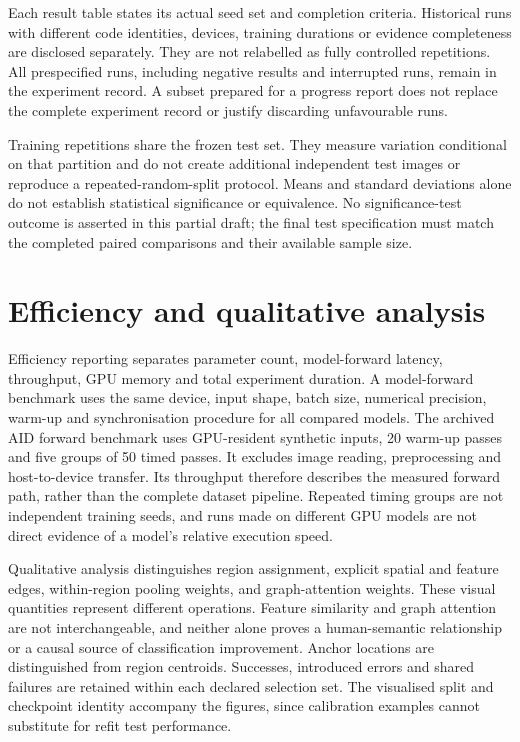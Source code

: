 Each result table states its actual seed set and completion criteria.
Historical runs with different code identities, devices, training durations
or evidence completeness are disclosed separately. They are not relabelled
as fully controlled repetitions. All prespecified runs, including negative
results and interrupted runs, remain in the experiment record. A subset
prepared for a progress report does not replace the complete experiment
record or justify discarding unfavourable runs.

Training repetitions share the frozen test set. They measure variation
conditional on that partition and do not create additional independent test
images or reproduce a repeated-random-split protocol. Means and standard
deviations alone do not establish statistical significance or equivalence.
No significance-test outcome is asserted in this partial draft; the final
test specification must match the completed paired comparisons and their
available sample size.

\section{Efficiency and qualitative analysis}

Efficiency reporting separates parameter count, model-forward latency,
throughput, GPU memory and total experiment duration. A model-forward
benchmark uses the same device, input shape, batch size, numerical precision,
warm-up and synchronisation procedure for all compared models. The archived
AID forward benchmark uses GPU-resident synthetic inputs, 20 warm-up passes
and five groups of 50 timed passes. It excludes image reading, preprocessing
and host-to-device transfer. Its throughput therefore describes the measured
forward path, rather than the complete dataset pipeline. Repeated timing
groups are not independent training seeds, and runs made on different GPU
models are not direct evidence of a model's relative execution speed.

Qualitative analysis distinguishes region assignment, explicit spatial and
feature edges, within-region pooling weights, and graph-attention weights.
These visual quantities represent different operations. Feature similarity
and graph attention are not interchangeable, and neither alone proves a
human-semantic relationship or a causal source of classification improvement.
Anchor locations are distinguished from region centroids. Successes,
introduced errors and shared failures are retained within each declared
selection set. The visualised split and checkpoint identity accompany the
figures, since calibration examples cannot substitute for refit test
performance.

